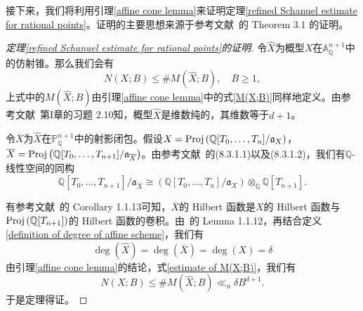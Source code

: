 接下来，我们将利用引理\ref{affine cone lemma}来证明定理\ref{refined Schanuel estimate for rational points}。证明的主要思想来源于参考文献~的 Theorem 3.1 的证明。

\begin{proof} [定理\ref{refined Schanuel estimate for rational points}的证明]
令$\hat{X}$为概型$X$在$\mathbb{A}^{n+1}_{\mathbb{Q}}$中的仿射锥。那么我们会有
\begin{equation}
N(X;B) \leqslant \#M(\hat{X};B), \quad B \geqslant 1,
\end{equation}
上式中的$M(\hat{X};B)$由引理\ref{affine cone lemma}中的式\eqref{M(X;B)}同样地定义。由参考文献~第I章的习题 2.10知，概型$\hat{X}$是维数纯的，其维数等于$d+1$。

令$\overline{X}$为$\hat{X}$在$\mathbb{P}^{n+1}_{\mathbb{Q}}$中的射影闭包。假设$X = \operatorname{Proj} \left( \mathbb{Q}[T_0,\ldots,T_n]/\mathfrak{a}_X \right)$，$\overline{X} = \operatorname{Proj} \left( \mathbb{Q}[T_0,\ldots,T_{n+1}]/\mathfrak{a}_{\overline{X}} \right)$。由参考文献~的(8.3.1.1)以及(8.3.1.2)，我们有$\mathbb{Q}$-线性空间的同构
\begin{equation}
\mathbb{Q}[T_0,\ldots,T_{n+1}]/\mathfrak{a}_{\overline{X}} \cong \left( \mathbb{Q}[T_0,\ldots,T_n]/\mathfrak{a}_X \right) \otimes_{\mathbb{Q}} \mathbb{Q}[T_{n+1}].
\end{equation}

有参考文献~的 Corollary 1.1.13可知，$\overline{X}$的 Hilbert 函数是$X$的 Hilbert 函数与$\operatorname{Proj} \left( \mathbb{Q}[T_{n+1}] \right)$的 Hilbert 函数的卷积。由~的 Lemma 1.1.12，再结合定义\ref{definition of degree of affine scheme}，我们有
\begin{equation}
\deg(\hat{X})=\deg(\overline{X}) = \deg(X) = \delta
\end{equation}
由引理\ref{affine cone lemma}的结论，式\eqref{estimate of M(X;B)}，我们有
\begin{equation}
N(X;B) \leqslant \#M(\hat{X};B) \ll_{n} \delta B^{d+1}.
\end{equation}
于是定理得证。
\end{proof}


